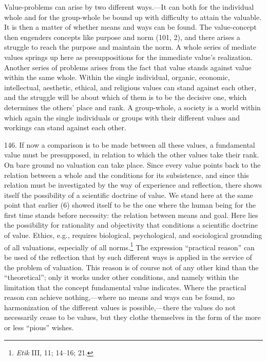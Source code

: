 \documentclass[12pt,a4paper]{book}
\newcommand{\opage}[1]{\marginnote{\footnotesize\textit{[#1]}}}
\begin{document}
Value-problems can arise by two different ways.---It can both for the individual whole and for the
group-whole be bound up with difficulty to attain the valuable. It is then a matter of whether means
and ways can be found. The value-concept then engenders concepts like purpose and norm (101, 2), and
there arises a struggle to reach the purpose and maintain the norm. A whole series of mediate values
springs up here as presuppositions for the immediate value's \opage{348}realization. Another series of problems
arises from the fact that value stands against value within the same whole. Within the single
individual, organic, economic, intellectual, aesthetic, ethical, and religious values can stand
against each other, and the struggle will be about which of them is to be the decisive one, which
determines the others' place and rank. A group-whole, a society is a world within which again the
single individuals or groups with their different values and workings can stand against each other.

146. If now a comparison is to be made between all these values, a fundamental value must be
presupposed, in relation to which the other values take their rank. On bare ground no valuation can
take place. Since every value points back to the relation between a whole and the conditions for its
subsistence, and since this relation must be investigated by the way of experience and reflection,
there shows itself the possibility of a scientific doctrine of value. We stand here at the same point
that earlier (6) showed itself to be the one where the human being for the first time stands before
necessity: the relation between means and goal. Here lies the possibility for rationality and
objectivity that conditions a scientific doctrine of value. Ethics, e.g., requires biological,
psychological, and sociological grounding of all valuations, especially of all norms.\footnote{\emph{Etik}
III, 11; 14--16; 21.} The expression ``practical reason'' can be used of the reflection that by such
different ways is applied in the service of the problem of valuation. This reason is of course not of
any other kind than the ``theoretical''; only it works under other conditions, and namely within the
limitation that the concept fundamental value indicates. Where the practical reason can achieve
nothing,---where no means and ways can be found, no harmonization of the different values is
possible,---there the values do not necessarily cease to be values, but they clothe themselves in the
form of the more or less ``pious'' wishes.
\end{document}
